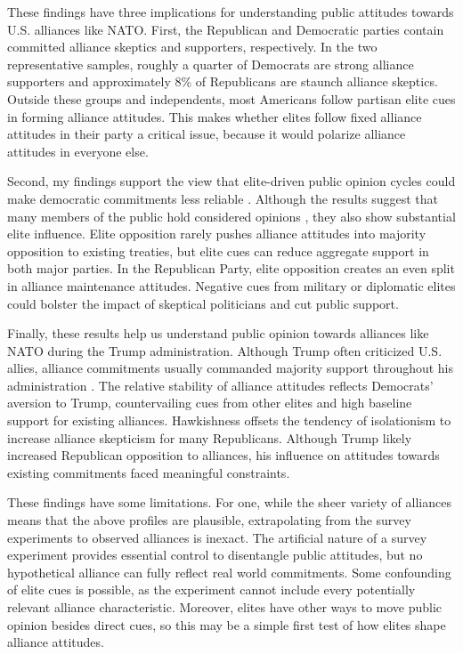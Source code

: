 \documentclass[12pt]{article}
\begin{document}
These findings have three implications for understanding public attitudes towards U.S. alliances like NATO. 
First, the Republican and Democratic parties contain committed alliance skeptics and supporters, respectively.
In the two representative samples, roughly a quarter of Democrats are strong alliance supporters and approximately 8\% of Republicans are staunch alliance skeptics.
Outside these groups and independents, most Americans follow partisan elite cues in forming alliance attitudes. 
This makes whether elites follow fixed alliance attitudes in their party a critical issue, because it would polarize alliance attitudes in everyone else.  


Second, my findings support the view that elite-driven public opinion cycles could make democratic commitments less reliable \citep{GartzkeGleditsch2004}. 
Although the results suggest that many members of the public hold considered opinions \citep{PageShapiro1992}, they also show substantial elite influence. 
Elite opposition rarely pushes alliance attitudes into majority opposition to existing treaties, but elite cues can reduce aggregate support in both major parties.
In the Republican Party, elite opposition creates an even split in alliance maintenance attitudes. 
Negative cues from military or diplomatic elites could bolster the impact of skeptical politicians and cut public support. 


Finally, these results help us understand public opinion towards alliances like NATO during the Trump administration.
Although Trump often criticized U.S. allies, alliance commitments usually commanded majority support throughout his administration \citep{PewNATO2020}. 
The relative stability of alliance attitudes reflects Democrats' aversion to Trump, countervailing cues from other elites and high baseline support for existing alliances.
Hawkishness offsets the tendency of isolationism to increase alliance skepticism for many Republicans.
Although Trump likely increased Republican opposition to alliances, his influence on attitudes towards existing commitments faced meaningful constraints. 


These findings have some limitations. 
For one, while the sheer variety of alliances means that the above profiles are plausible, extrapolating from the survey experiments to observed alliances is inexact. 
The artificial nature of a survey experiment provides essential control to disentangle public attitudes, but no hypothetical alliance can fully reflect real world commitments.
Some confounding of elite cues is possible, as the experiment cannot include every potentially relevant alliance characteristic. 
Moreover, elites have other ways to move public opinion besides direct cues, so this may be a simple first test of how elites shape alliance attitudes. 
\end{document}
